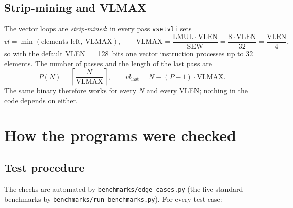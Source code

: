 \documentclass[11pt,a4paper]{article}
\newcommand{\code}[1]{\texttt{#1}}
\begin{document}
\subsection{Strip-mining and VLMAX}

The vector loops are \emph{strip-mined}: in every pass \code{vsetvli} sets
\[
  vl = \min(\text{elements left},\ \mathrm{VLMAX}), \qquad
  \mathrm{VLMAX} = \frac{\mathrm{LMUL}\cdot\mathrm{VLEN}}{\mathrm{SEW}}
               = \frac{8\cdot\mathrm{VLEN}}{32} = \frac{\mathrm{VLEN}}{4},
\]
so with the default VLEN~=~128~bits one vector instruction processes up to 32 elements. The
number of passes and the length of the last pass are
\[
  P(N) = \left\lceil \frac{N}{\mathrm{VLMAX}} \right\rceil, \qquad
  vl_{\text{last}} = N - (P-1)\cdot\mathrm{VLMAX}.
\]
The same binary therefore works for every $N$ and every VLEN; nothing in the code depends on
either.

\section{How the programs were checked}

\subsection{Test procedure}

The checks are automated by \code{benchmarks/edge\_cases.py} (the five standard benchmarks by
\code{benchmarks/run\_benchmarks.py}). For every test case:
\end{document}
